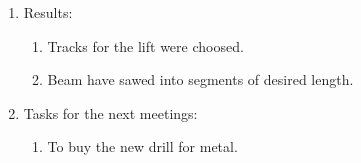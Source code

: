 \begin{enumerate}
\begin{enumerate}
\begin{enumerate}
      \end{enumerate}
      
    \end{enumerate}
    
	\item Results:
	\begin{enumerate}
	  \item Tracks for the lift were choosed.
	  
	  \item Beam have sawed into segments of desired length.
	  
	   
    \end{enumerate}
    
	\item Tasks for the next meetings:
	\begin{enumerate}
	  \item To buy the new drill for metal.
	  
    \end{enumerate}     
\end{enumerate}
\fillpage
